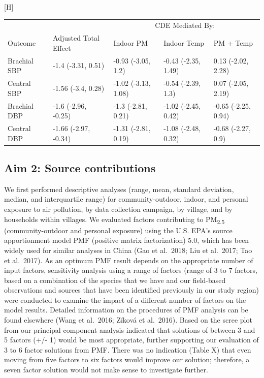 \documentclass[
  letterpaper,
  DIV=11,
  numbers=noendperiod]{scrartcl}
\makeatletter
\renewenvironment{table}%
  {\renewcommand\familydefault\sfdefault
   \@float{table}}
  {\end@float}
\makeatother
\begin{document}
\hypertarget{tbl-bp-med}{}
\begin{table}[H]
\caption{\label{tbl-bp-med}Controlled direct effects for the CBHP policy }\tabularnewline

\centering
\begin{tabular}{lllll}
\toprule
\multicolumn{2}{c}{ } & \multicolumn{3}{c}{CDE Mediated By:} \\
\cmidrule(l{3pt}r{3pt}){3-5}
Outcome & Adjusted Total Effect & Indoor PM & Indoor Temp & PM + Temp\\
\midrule
Brachial SBP & -1.4 (-3.31, 0.51) & -0.93 (-3.05, 1.2) & -0.43 (-2.35, 1.49) & 0.13 (-2.02, 2.28)\\
Central SBP & -1.56 (-3.4, 0.28) & -1.02 (-3.13, 1.08) & -0.54 (-2.39, 1.3) & 0.07 (-2.05, 2.19)\\
Brachial DBP & -1.6 (-2.96, -0.25) & -1.3 (-2.81, 0.21) & -1.02 (-2.45, 0.42) & -0.65 (-2.25, 0.94)\\
Central DBP & -1.66 (-2.97, -0.34) & -1.31 (-2.81, 0.19) & -1.08 (-2.48, 0.32) & -0.68 (-2.27, 0.9)\\
\bottomrule
\end{tabular}
\end{table}

\hypertarget{aim-2-source-contributions}{%
\subsection{Aim 2: Source
contributions}\label{aim-2-source-contributions}}

We first performed descriptive analyses (range, mean, standard
deviation, median, and interquartile range) for community-outdoor,
indoor, and personal exposure to air pollution, by data collection
campaign, by village, and by households within villages. We evaluated
factors contributing to PM\textsubscript{2.5} (community-outdoor and
personal exposure) using the U.S. EPA's source apportionment model PMF
(positive matrix factorization) 5.0, which has been widely used for
similar analyses in China (Gao et al.~2018; Liu et al.~2017; Tao et
al.~2017). As an optimum PMF result depends on the appropriate number of
input factors, sensitivity analysis using a range of factors (range of 3
to 7 factors, based on a combination of the species that we have and our
field-based observations and sources that have been identified
previously in our study region) were conducted to examine the impact of
a different number of factors on the model results. Detailed information
on the procedures of PMF analysis can be found elsewhere (Wang et
al.~2016; Zíková et al.~2016). Based on the scree plot from our
principal component analysis indicated that solutions of between 3 and 5
factors (+/- 1) would be most appropriate, further supporting our
evaluation of 3 to 6 factor solutions from PMF. There was no indication
(Table X) that even moving from five factors to six factors would
improve our solution; therefore, a seven factor solution would not make
sense to investigate further.
\end{document}
